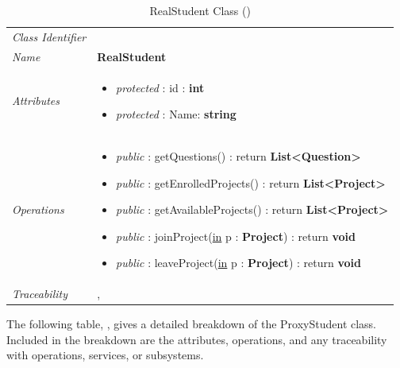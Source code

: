 \documentclass[12pt,letterpaper]{article}
\begin{document}
\begin{table}[H]
    \caption{RealStudent Class ()} 
	\begin{tabu} to 
		\toprule
		Class Identifier &  \\
		Name & {\bf RealStudent} \\
		Attributes & 
		\begin{minipage}[t]{\linewidth}
		    \begin{itemize}
		        \item \textit{protected} : id : {\bf int}
		        \item \textit{protected} : Name: {\bf string}
			\end{itemize}
	    \end{minipage} \\

		Operations &
		\begin{minipage}[t]{\linewidth}
			\begin{itemize}
			    \item {\it public} : getQuestions() : return {\bf List<Question>}
			    \item {\it public} : getEnrolledProjects() : return {\bf List<Project>}
			    \item {\it public} : getAvailableProjects() : return {\bf List<Project>}
			    \item {\it public} : joinProject(\underline{in} p : {\bf Project}) : return {\bf void}
			    \item {\it public} : leaveProject(\underline{in} p : {\bf Project}) : return {\bf void}
	        \end{itemize}
	    \end{minipage} \\
	    	Traceability & , \\
		\toprule
	\end{tabu}
\end{table}

The following table, , gives a detailed breakdown of the ProxyStudent class. Included in the breakdown are the attributes, operations, and any traceability with operations, services, or subsystems.
\end{document}

